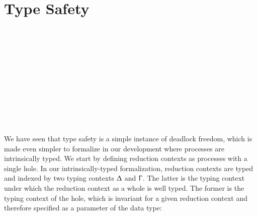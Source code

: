 \section{Type Safety}
\label{sec:safety-agda}

\begin{code}[hide]%
\>[0]\AgdaSpace{}%
\AgdaSpace{}%
\<%
\\
\>[0]\AgdaSpace{}%
\AgdaSpace{}%
\AgdaSpace{}%
\AgdaSpace{}%
\AgdaSymbol{(}\AgdaOperator{\AgdaInductiveConstructor{\AgdaUnderscore{},\AgdaUnderscore{}}}\AgdaSymbol{)}\<%
\\
\>[0]\AgdaSpace{}%
\AgdaSpace{}%
\AgdaSpace{}%
\AgdaSpace{}%
\AgdaSymbol{(}\AgdaSymbol{;}\AgdaSpace{}%
\AgdaSymbol{)}\<%
\\
\>[0]\AgdaSpace{}%
\AgdaSpace{}%
\AgdaSpace{}%
\AgdaSpace{}%
\AgdaSymbol{(}\AgdaInductiveConstructor{[]}\AgdaSymbol{;}\AgdaSpace{}%
\AgdaSymbol{;}\AgdaSpace{}%
\AgdaOperator{\AgdaFunction{[\AgdaUnderscore{}]}}\AgdaSymbol{)}\<%
\\
%
\\[\AgdaEmptyExtraSkip]%
\>[0]\AgdaSpace{}%
\AgdaSpace{}%
\<%
\\
\>[0]\AgdaSpace{}%
\AgdaSpace{}%
\<%
\\
\>[0]\AgdaSpace{}%
\AgdaSpace{}%
\<%
\\
\>[0]\AgdaSpace{}%
\AgdaSpace{}%
\<%
\\
\>[0]\AgdaSpace{}%
\AgdaSpace{}%
\<%
\\
\>[0]\AgdaSpace{}%
\AgdaSpace{}%
\<%
\end{code}

We have seen that type safety is a simple instance of deadlock freedom, which is
made even simpler to formalize in our development where processes are
intrinsically typed. We start by defining reduction contexts as processes with a
single hole. In our intrinsically-typed formalization, reduction contexts are
typed and indexed by two typing contexts $\Updelta$ and $\Upgamma$. The latter
is the typing context under which the reduction context as a whole is well
typed. The former is the typing context of the hole, which is invariant for a
given reduction context and therefore specified as a parameter of the data type:

